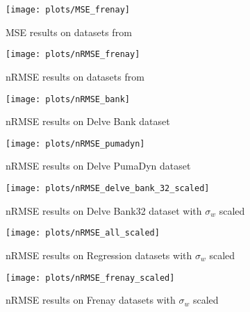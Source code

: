 \begin{figure}
    \texttt{[image: plots/MSE\_frenay]}
    \caption{MSE results on datasets from \cite{frenayParameterinsensitiveKernelExtreme2011}}
\end{figure}


\begin{figure}
    \texttt{[image: plots/nRMSE\_frenay]}
    \caption{nRMSE results on datasets from \cite{frenayParameterinsensitiveKernelExtreme2011}}
\end{figure}

\begin{figure}
    \texttt{[image: plots/nRMSE\_bank]}
    \caption{nRMSE results on Delve Bank dataset}
\end{figure}

\begin{figure}
    \texttt{[image: plots/nRMSE\_pumadyn]}
    \caption{nRMSE results on Delve PumaDyn dataset}
\end{figure}

\begin{figure}
    \texttt{[image: plots/nRMSE\_delve\_bank\_32\_scaled]}
    \caption{nRMSE results on Delve Bank32 dataset with $\sigma_w$ scaled}
\end{figure}

\begin{figure}
    \texttt{[image: plots/nRMSE\_all\_scaled]}
    \caption{nRMSE results on Regression datasets with $\sigma_w$ scaled}
\end{figure}

\begin{figure}
    \texttt{[image: plots/nRMSE\_frenay\_scaled]}
    \caption{nRMSE results on Frenay datasets with $\sigma_w$ scaled}
\end{figure}
